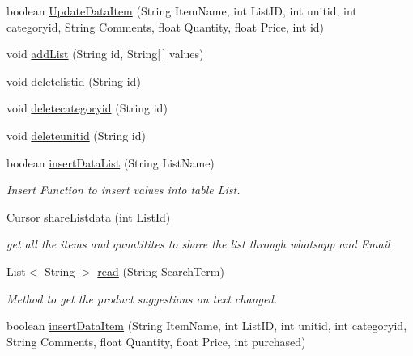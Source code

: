 \begin{DoxyCompactItemize}
\item 
boolean \hyperlink{classcom_1_1example_1_1santh_1_1shoppinglist_1_1_data_base_manager_a471dab48ad6de705ae874d0b22335de3}{Update\+Data\+Item} (String Item\+Name, int List\+ID, int unitid, int categoryid, String Comments, float Quantity, float Price, int id)
\item 
void \hyperlink{classcom_1_1example_1_1santh_1_1shoppinglist_1_1_data_base_manager_ae539ad8cc244d4da2b60f23d1601b42e}{add\+List} (String id, String\mbox{[}$\,$\mbox{]} values)
\item 
void \hyperlink{classcom_1_1example_1_1santh_1_1shoppinglist_1_1_data_base_manager_ab5aaf1da6ce563dcc4ce4e7f63bc58de}{deletelistid} (String id)
\item 
void \hyperlink{classcom_1_1example_1_1santh_1_1shoppinglist_1_1_data_base_manager_a1e0bad58bdfe608855e3785f82c38d46}{deletecategoryid} (String id)
\item 
void \hyperlink{classcom_1_1example_1_1santh_1_1shoppinglist_1_1_data_base_manager_a987e069d2da99af080009eae9bed0cbe}{deleteunitid} (String id)
\item 
boolean \hyperlink{classcom_1_1example_1_1santh_1_1shoppinglist_1_1_data_base_manager_a69d01cf1de4f01774078111e0eaef829}{insert\+Data\+List} (String List\+Name)
\begin{DoxyCompactList}\small\item\em Insert Function to insert values into table List. \end{DoxyCompactList}\item 
Cursor \hyperlink{classcom_1_1example_1_1santh_1_1shoppinglist_1_1_data_base_manager_afb695f603f9d2f7e58c3746e535358ec}{share\+Listdata} (int List\+Id)
\begin{DoxyCompactList}\small\item\em get all the items and qunatitites to share the list through whatsapp and Email \end{DoxyCompactList}\item 
List$<$ String $>$ \hyperlink{classcom_1_1example_1_1santh_1_1shoppinglist_1_1_data_base_manager_a307e4d523baab740e4e01178d6bd5118}{read} (String Search\+Term)
\begin{DoxyCompactList}\small\item\em Method to get the product suggestions on text changed. \end{DoxyCompactList}\item 
boolean \hyperlink{classcom_1_1example_1_1santh_1_1shoppinglist_1_1_data_base_manager_ae97008248a1324d0eaf6451ac238acaa}{insert\+Data\+Item} (String Item\+Name, int List\+ID, int unitid, int categoryid, String Comments, float Quantity, float Price, int purchased)

\end{DoxyCompactItemize}
